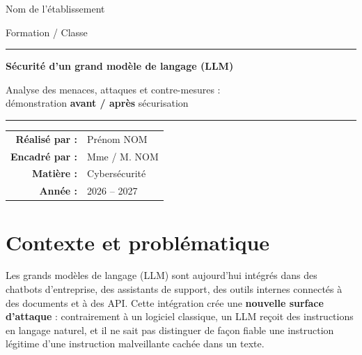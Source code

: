 \documentclass[11pt,a4paper]{article}
\newcommand{\etudiant}{Prénom NOM}
\newcommand{\professeur}{Mme / M. NOM}
\newcommand{\etablissement}{Nom de l'établissement}
\newcommand{\formation}{Formation / Classe}
\newcommand{\anneeuniv}{2026 -- 2027}
\begin{document}
\begin{titlepage}
\centering
{\large\color{gris}\etablissement\par}
{\color{gris}\formation\par}
\vspace{3cm}
{\color{bleu}\rule{\linewidth}{1pt}\par}
\vspace{0.6cm}
{\Huge\bfseries\color{bleu} Sécurité d'un grand modèle de langage (LLM)\par}
\vspace{0.4cm}
{\Large Analyse des menaces, attaques et contre-mesures :\\ démonstration \textbf{avant / après} sécurisation\par}
\vspace{0.6cm}
{\color{bleu}\rule{\linewidth}{1pt}\par}
\vspace{2.5cm}


\vfill
\begin{tabular}{rl}
\textbf{Réalisé par :} & \etudiant \\
\textbf{Encadré par :} & \professeur \\
\textbf{Matière :} & Cybersécurité \\
\textbf{Année :} & \anneeuniv \\
\end{tabular}
\end{titlepage}

\tableofcontents
\newpage

\section{Contexte et problématique}

Les grands modèles de langage (LLM) sont aujourd'hui intégrés dans des chatbots d'entreprise, des assistants de support, des outils internes connectés à des documents et à des API. Cette intégration crée une \textbf{nouvelle surface d'attaque} : contrairement à un logiciel classique, un LLM reçoit des instructions en langage naturel, et il ne sait pas distinguer de façon fiable une instruction légitime d'une instruction malveillante cachée dans un texte.
\end{document}
